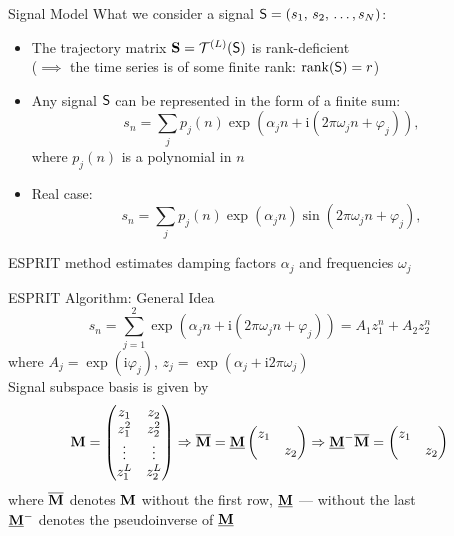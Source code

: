 \documentclass[pdf, unicode, ucs, notheorems]{beamer}
\theoremstyle{definition}
\begin{document}
\begin{frame}{Signal Model}
  What we consider a signal $\mathsf{S} = (s_1,\, s_2,\, \ldots, s_N)$:\smallskip
  \begin{itemize}
    \item The trajectory matrix $\mathbf{S} = \mathcal{T}^{(L)}(\mathsf{S})$ is rank-deficient \\
      ($\implies$ the time series is of some finite rank:
      $\operatorname{rank}(\mathsf{S})=r$)
      \medskip
    \item Any signal $\mathsf{S}$ can be represented in the form of a finite sum:
      \[
        s_n = \sum_{j} p_j(n) \exp(\alpha_j n + \mathrm{i}(2\pi
        \omega_j n + \varphi_j)),
      \]
      where $p_j(n)$ is a polynomial in $n$
      \medskip
    \item Real case:
      \[
        s_n = \sum_{j} p_j(n) \exp(\alpha_j n)\sin(2\pi
        \omega_j n + \varphi_j),
      \]
  \end{itemize}
  \bigskip
  ESPRIT method estimates damping factors $\alpha_j$ and
  frequencies $\omega_j$
\end{frame}

\begin{frame}{ESPRIT Algorithm: General Idea}
  \[
    s_n = \sum_{j=1}^{2} \exp(\alpha_j n + \mathrm{i}(2\pi
    \omega_j n + \varphi_j)) = A_1 z_1^n + A_2 z_2^n
  \]
  where $A_j = \exp(\mathrm{i} \varphi_j)$, $z_j = \exp(\alpha_j +
  \mathrm{i}2\pi\omega_j)$ \vspace{0.4cm}\\
  Signal subspace basis is given by
  \[
    \mathbf{M} =
    \begin{pmatrix}
      z_1 & z_2 \\
      z_1^2 & z_2^2\\
      \vdots & \vdots \\
      z_1^L & z_2^L
    \end{pmatrix} \Rightarrow \overline{\mathbf{M}} = \underline{\mathbf{M}}
    \begin{pmatrix}
      z_1 & \\ & z_2
    \end{pmatrix}\Rightarrow  \underline{\mathbf{M}}^{-}\overline{\mathbf{M}} =
    \begin{pmatrix}
      z_1 & \\ & z_2
    \end{pmatrix}
  \]
  where $\overline{\mathbf{M}}$ denotes $\mathbf{M}$ without the first row,
  $\underline{\mathbf{M}}$ --- without the last\\
  $\underline{\mathbf{M}}^{-}$ denotes the pseudoinverse of $\underline{\mathbf{M}}$
\end{frame}
\end{document}
